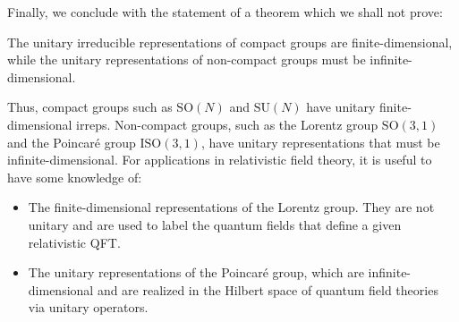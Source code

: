 Finally, we conclude with the statement of a theorem which we shall not prove:
\begin{theorem}\label{thm:unitary_representations_compact_noncompact_groups}
    The unitary irreducible representations of compact groups are finite-dimensional, while the unitary representations of non-compact groups must be infinite-dimensional.
\end{theorem}

Thus, compact groups such as $\mathrm{SO}(N)$ and $\mathrm{SU}(N)$ have unitary finite-dimensional irreps. Non-compact groups, such as the Lorentz group $\mathrm{SO}(3,1)$ and the Poincaré group $\mathrm{ISO}(3,1)$, have unitary representations that must be infinite-dimensional. For applications in relativistic field theory, it is useful to have some knowledge of:

\begin{itemize}
    \item The finite-dimensional representations of the Lorentz group. They are not unitary and are used to label the quantum fields that define a given relativistic QFT.
    \item The unitary representations of the Poincaré group, which are infinite-dimensional and are realized in the Hilbert space of quantum field theories via unitary operators.
\end{itemize}